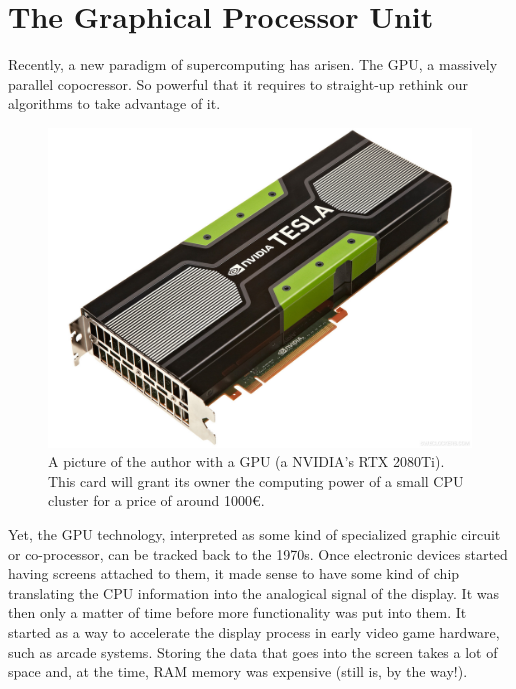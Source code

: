 \documentclass[ twoside,openright,titlepage,numbers=noenddot,%
headinclude,footinclude,cleardoublepage=empty,abstract=on,
BCOR=5mm,paper=a4,fontsize=11pt, dvipsnames
]{scrreprt}
\newcommand{\gpu}{\gls{GPU}\xspace}
\begin{document}
\section{The Graphical Processor Unit}

Recently, a new paradigm of supercomputing has arisen. The \gpu, a massively parallel copocressor. So powerful that it requires to straight-up rethink our algorithms to take advantage of it.

\begin{figure}
  \centering
  \includegraphics[width=\textwidth]{gpu_and_me}
  \caption{A picture of the author with a GPU (a NVIDIA's RTX 2080Ti). This card will grant its owner the computing power of a small CPU cluster for a price of around 1000€.}
  \label{fig:gpuandme}
\end{figure}

Yet, the \gpu technology, interpreted as some kind of specialized graphic circuit or co-processor, can be tracked back to the 1970s. Once electronic devices started having screens attached to them, it made sense to have some kind of chip translating the CPU information into the analogical signal of the display. It was then only a matter of time before more functionality was put into them. It started as a way to accelerate the display process in early video game hardware, such as arcade systems.
Storing the data that goes into the screen takes a lot of space and, at the time, RAM memory was expensive (still is, by the way!).
\end{document}
